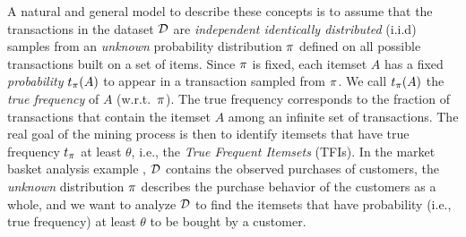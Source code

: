 A natural and general model to describe these concepts %
is to assume that the transactions in the dataset ${\cal D}$ are \emph{independent
identically distributed} (i.i.d) samples from an \emph{unknown} probability
distribution $\pi$ defined on all possible transactions built on a set of
items. %
Since $\pi$ is fixed, each itemset $A$ has a fixed \emph{probability} $t_\pi(A)$
to appear in a transaction sampled from $\pi$. We call $t_\pi(A)$ the
\emph{true frequency} of $A$ (w.r.t.~$\pi$). The true frequency corresponds
to the fraction of transactions that contain the itemset $A$ among an infinite
set %
of transactions. %
The real goal of the mining process is then to identify itemsets that have
true frequency $t_\pi$ at least $\theta$, i.e., the \emph{True Frequent
Itemsets} (TFIs). %
In the market basket analysis example%
, ${\cal D}$ contains %
the observed purchases of customers, the \emph{unknown} distribution $\pi$
describes the purchase behavior of the customers as a whole, and we want to
analyze ${\cal D}$ to find the itemsets that have probability (i.e., true frequency) %
at least $\theta$ to be bought by a customer.

